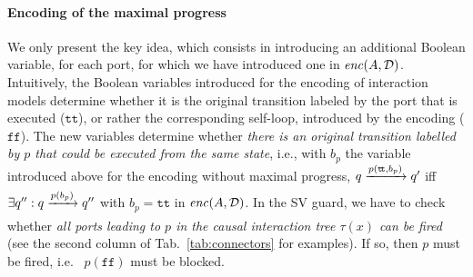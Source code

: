\documentclass{llncs}
\newcommand{\todoSB}[2][color=green!40, size=\tiny]{\todo[#1]{\textbf{To-do Simon:} {#2}}}
\newcommand{\tab}[1]{Tab.~\ref{tab:#1}}
\newcommand{\eq}[1]{(\ref{eq:#1})}
\newcommand{\app}[1]{App.~\ref{secn:#1}}
\newcommand{\cD}{\ensuremath{\mathcal{D}}}
\newcommand{\ie}[1][\ ]{i.e.#1}
\newcommand{\goesto}[2][]{\ensuremath{\xrightarrow[{#1}\relax]{#2}}}
\newcommand{\true} {\ensuremath{\mathtt{t\!t}}}
\newcommand{\false}{\ensuremath{\mathtt{f\!f}}}
\newcommand{\trigsynch}{%
  \mbox{\ensuremath{\blacktriangleright\!\!\!-\!\!\!-\!\!\!\bullet}}}
\newcommand{\nopri}[1][]{\ensuremath{\mathit{enc}%
    \ifx#1\relax\else(#1)\fi}}
\newcommand{\partition}{\cD}
\begin{document}


\paragraph{Encoding of the maximal progress}
We only present the key idea, which consists in
introducing an additional Boolean variable, for each port, for which we
have introduced one in $\nopri[A, \partition]$.  Intuitively, 
the Boolean
variables introduced for the encoding of interaction models
determine whether it is the original transition
labeled by the port that is executed (\true), or rather the corresponding
self-loop, introduced by the encoding (\false).  The new variables
determine whether \emph{there is an original transition labelled by
  $p$ that could be executed from the same state}, \ie[,] with $b_p$
the variable introduced above for the encoding without maximal
progress, $q \goesto{p(\true, b_p)} q'$ iff $\exists q'': q
\goesto{p(b_p)} q''$ with $b_p = \true$ in $\nopri[A, \partition]$.
In the SV guard, we have to check whether \emph{all ports
  leading to $p$ in the causal interaction tree $\tau(x)$ can be fired} (see the second column of
\tab{connectors} for examples).  If so, then $p$ must be fired, \ie
$p(\false)$ must be blocked.
\end{document}
